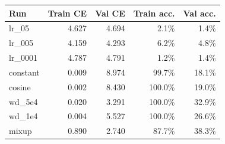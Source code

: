 \begin{tabular}{lrrrr}
\hline
Run & Train CE & Val CE & Train acc. & Val acc. \\
\hline
lr\_05 & 4.627 & 4.694 & 2.1\% & 1.4\% \\
lr\_005 & 4.159 & 4.293 & 6.2\% & 4.8\% \\
lr\_0001 & 4.787 & 4.791 & 1.2\% & 1.4\% \\
constant & 0.009 & 8.974 & 99.7\% & 18.1\% \\
cosine & 0.002 & 8.430 & 100.0\% & 19.0\% \\
wd\_5e4 & 0.020 & 3.291 & 100.0\% & 32.9\% \\
wd\_1e4 & 0.004 & 5.527 & 100.0\% & 26.6\% \\
mixup & 0.890 & 2.740 & 87.7\% & 38.3\% \\
\hline
\end{tabular}
